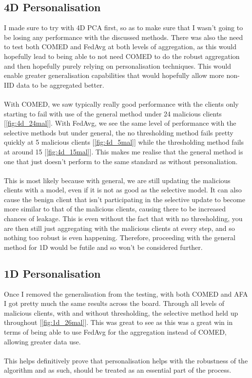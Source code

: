 \subsection{4D Personalisation}
I made sure to try with 4D PCA first, so as to make sure that I wasn't going to be losing any performance with the discussed methods.
There was also the need to test both COMED and FedAvg at both levels of aggregation, as this would hopefully lead to being able to not need COMED to do the robust aggregation and then hopefully purely relying on personalisation techniques.
This would enable greater generalisation capabilities that would hopefully allow more non-IID data to be aggregated better.
\\ \\ 
With COMED, we saw typically really good performance with the clients only starting to fail with use of the general method under 24 malicious clients [\ref{fig:4d_24mal}].
With FedAvg, we see the same level of performance with the selective methods but under general, the no thresholding method fails pretty quickly at 5 malicious clients [\ref{fig:4d_5mal}] while the thresholding method fails at around 15 [\ref{fig:4d_15mal}].
This makes me realise that the general method is one that just doesn't perform to the same standard as without personaliation.
\\ \\
This is most likely because with general, we are still updating the malicious clients with a model, even if it is not as good as the selective model.
It can also cause the benign client that isn't participating in the selective update to become more similar to that of the malicious clients, causing there to be increased chances of leakage.
This is even without the fact that with no thresholding, you are then still just aggregating with the malicious clients at every step, and so nothing too robust is even happening.
Therefore, proceeding with the general method for 1D would be futile and so won't be considered further.

\subsection{1D Personalisation}
Once I removed the generalisation from the testing, with both COMED and AFA I got pretty much the same results across the board.
Through all levels of malicious clients, with and without thresholding, the selective method held up throughout [\ref{fig:1d_26mal}].
This was great to see as this was a great win in terms of being able to use FedAvg for the aggregation instead of COMED, allowing greater data use.
\\ \\
This helps definitively prove that personalisation helps with the robustness of the algorithm and as such, should be treated as an essential part of the process.


